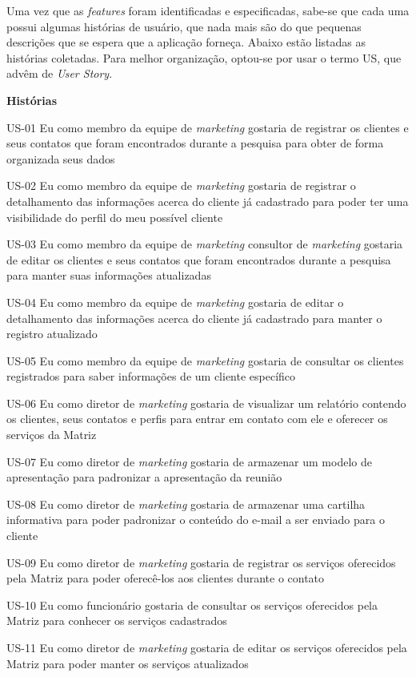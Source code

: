 Uma vez que as \textit{features} foram identificadas e especificadas, sabe-se que cada uma possui algumas histórias de usuário, que nada mais são do que pequenas descrições que se espera que a aplicação forneça. Abaixo estão listadas as histórias coletadas. Para melhor organização, optou-se por usar o termo US, que advêm de \textit{User Story}.

\textbf{Histórias}

US-01 Eu como membro da equipe de \textit{marketing} gostaria de registrar os clientes e seus contatos que foram encontrados durante a pesquisa para obter de forma organizada seus dados


US-02 Eu como membro da equipe de \textit{marketing} gostaria de registrar o detalhamento das informações acerca do cliente já cadastrado para poder ter uma visibilidade do perfil do meu possível cliente


US-03 Eu como membro da equipe de \textit{marketing} consultor de \textit{marketing} gostaria de editar os clientes e seus contatos que foram encontrados durante a pesquisa para manter suas informações atualizadas


US-04 Eu como membro da equipe de \textit{marketing} gostaria de editar o detalhamento das informações acerca do cliente já cadastrado para manter o registro atualizado


US-05 Eu como membro da equipe de \textit{marketing} gostaria de consultar os clientes registrados para saber informações de um cliente específico


US-06 Eu como diretor de \textit{marketing} gostaria de visualizar um relatório contendo os clientes, seus contatos e perfis para entrar em contato com ele e oferecer os serviços da Matriz


US-07 Eu como diretor de \textit{marketing} gostaria de armazenar um modelo de apresentação para padronizar a apresentação da reunião


US-08 Eu como diretor de \textit{marketing} gostaria de armazenar uma cartilha informativa para poder padronizar o conteúdo do e-mail a ser enviado para o cliente


US-09 Eu como diretor de \textit{marketing} gostaria de registrar os serviços oferecidos pela Matriz para poder oferecê-los aos clientes durante o contato


US-10 Eu como funcionário gostaria de consultar os serviços oferecidos pela Matriz para conhecer os serviços cadastrados


US-11 Eu como diretor de \textit{marketing} gostaria de editar os serviços oferecidos pela Matriz para poder manter os serviços atualizados


